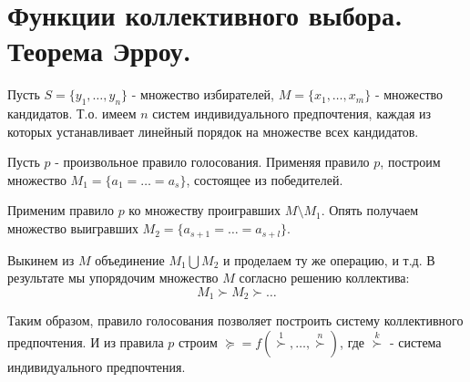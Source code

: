 \chapter{Функции коллективного выбора. Теорема Эрроу.}\label{cha:5}

Пусть $S = \{y_1, \dots, y_n\}$ - множество избирателей, $M = \{x_1, \dots, x_m\}$ - множество кандидатов. Т.о. имеем $n$ систем индивидуального предпочтения, каждая из которых устанавливает линейный порядок на множестве всех кандидатов.

Пусть $p$ - произвольное правило голосования. Применяя правило $p$, построим множество $M_1 = \{a_1 = \dots = a_s\}$, состоящее из победителей. 

Применим правило $p$ ко множеству проигравших $M \setminus M_1$. Опять получаем множество выигравших $M_2 = \{a_{s+1} = \dots = a_{s+l}\}$.

Выкинем из $M$ объединение $M_1 \bigcup M_2$ и проделаем ту же операцию, и т.д. В результате мы упорядочим множество $M$ согласно решению коллектива: 
$$M_1 \succ M_2 \succ \dots$$

Таким образом, правило голосования позволяет построить систему коллективного предпочтения. И из правила $p$ строим  $\succeq = f(\overset{1}{\succ}, \dots, \overset{n}{\succ})$, где $\overset{k}{\succ}$ - система индивидуального предпочтения.

